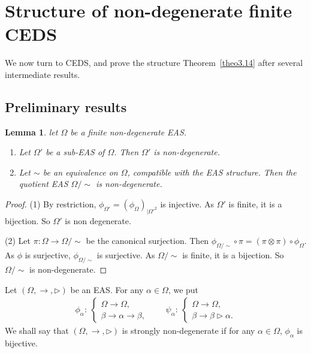 \documentclass[pdftex]{sigma}
\numberwithin{equation}{section}
\newtheorem{Lemma}[Theorem]{Lemma}
\begin{document}
\section{Structure of non-degenerate finite CEDS}

We now turn to CEDS, and prove the structure Theorem~\ref{theo3.14} after several intermediate results.

\subsection{Preliminary results}

\begin{Lemma}\label{lem3.1}
let $\Omega$ be a finite non-degenerate EAS.
\begin{enumerate}\itemsep=0pt
\item[$(1)$] Let $\Omega'$ be a sub-EAS of $\Omega$. Then $\Omega'$ is non-degenerate.
\item[$(2)$] Let $\sim$ be an equivalence on $\Omega$, compatible with the EAS structure. Then the quotient EAS $\Omega/{\sim}$ is non-degenerate.
\end{enumerate}
\end{Lemma}

\begin{proof}
(1) By restriction, $\phi_{\Omega'}=(\phi_\Omega)_{\mid \Omega'^2}$ is injective. As $\Omega'$ is finite, it is a bijection. So $\Omega'$ is non degenerate.

(2) Let $\pi\colon\Omega\longrightarrow \Omega/{\sim}$ be the canonical surjection. Then $\phi_{\Omega/{\sim}}\circ \pi=(\pi\otimes \pi)\circ \phi_\Omega$. As $\phi$ is surjective, $\phi_{\Omega/{\sim}}$ is surjective.
As $\Omega/{\sim}$ is finite, it is a bijection. So $\Omega/{\sim}$ is non-degenerate.
 \end{proof}

\begin{Definition}
Let $(\Omega,\rightarrow,\triangleright)$ be an EAS. For any $\alpha \in \Omega$, we put
\begin{align*}
\phi_\alpha\colon\ \begin{cases}
\Omega \longrightarrow \Omega,\\
\beta \longrightarrow \alpha\rightarrow \beta,
\end{cases}\qquad
\psi_\alpha\colon\ \begin{cases}
\Omega \longrightarrow \Omega,\\
\beta \longrightarrow \beta\triangleright\alpha.
\end{cases}
\end{align*}
We shall say that $(\Omega,\rightarrow,\triangleright)$ is strongly non-degenerate if for any $\alpha\in \Omega$, $\phi_\alpha$ is bijective.
\end{Definition}
\end{document}
